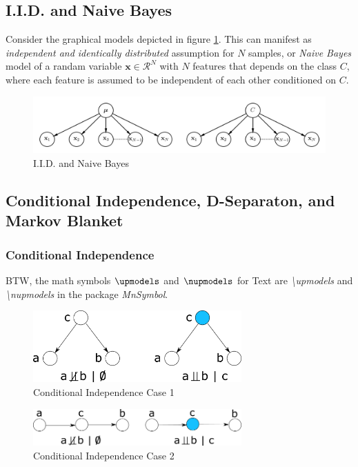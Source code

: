 \documentclass[a4]{article}
\begin{document}
\subsection{I.I.D. and Naive Bayes}
Consider the graphical models depicted in figure \ref{fig:iid_naive_bayes}.
This can manifest as \textit{independent and identically distributed} assumption for $N$ samples, or
\textit{Naive Bayes} model of a randam variable $\bm{x} \in \mathcal{R}^N$ with $N$ features that depends on the class $C$, where each feature is assumed to be independent of each other conditioned on $C$.
\begin{figure}[!htb]
\centering
\includegraphics[width=12cm]{iid_naive_bayes.png}
\caption{I.I.D. and Naive Bayes}
\label{fig:iid_naive_bayes}
\end{figure}

\subsection{Conditional Independence, D-Separaton, and Markov Blanket}

\subsubsection{Conditional Independence}

BTW, the math symbols $\upmodels$ and $\nupmodels$ for Text are
\textit{{\textbackslash}upmodels} and \textit{{\textbackslash}nupmodels}
in the package \textit{MnSymbol}.

\begin{figure}[!htb]
\centering
\includegraphics[width=8cm]{cond1.png}
\caption{Conditional Independence Case 1}
\label{fig:cond1}
\end{figure}

\begin{figure}[!htb]
\centering
\includegraphics[width=8cm]{cond2.png}
\caption{Conditional Independence Case 2}
\label{fig:cond2}
\end{figure}
\end{document}
